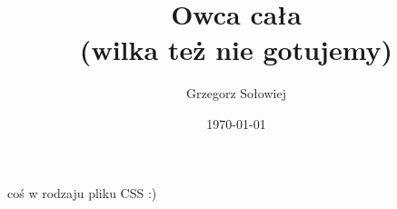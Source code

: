 \documentclass{sou_cook}
\author{Grzegorz Sołowiej}
\title{\huge{Owca cała}\\
\normalsize{(wilka też nie gotujemy)}}
\date{\today}
\begin{document}
coś w rodzaju pliku CSS :)
\end{document}

